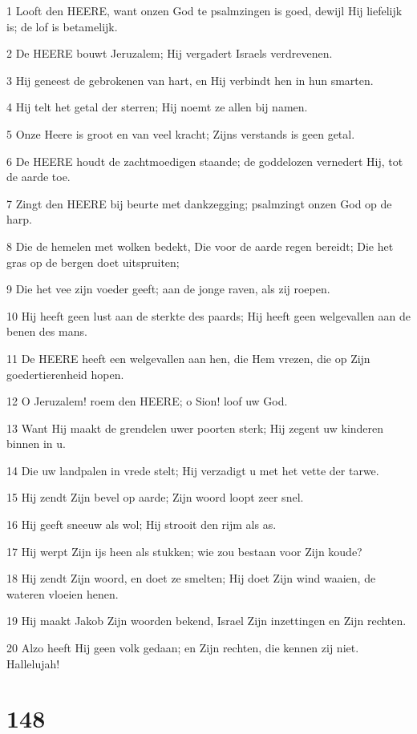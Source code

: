 \par 1 Looft den HEERE, want onzen God te psalmzingen is goed, dewijl Hij liefelijk is; de lof is betamelijk.
\par 2 De HEERE bouwt Jeruzalem; Hij vergadert Israels verdrevenen.
\par 3 Hij geneest de gebrokenen van hart, en Hij verbindt hen in hun smarten.
\par 4 Hij telt het getal der sterren; Hij noemt ze allen bij namen.
\par 5 Onze Heere is groot en van veel kracht; Zijns verstands is geen getal.
\par 6 De HEERE houdt de zachtmoedigen staande; de goddelozen vernedert Hij, tot de aarde toe.
\par 7 Zingt den HEERE bij beurte met dankzegging; psalmzingt onzen God op de harp.
\par 8 Die de hemelen met wolken bedekt, Die voor de aarde regen bereidt; Die het gras op de bergen doet uitspruiten;
\par 9 Die het vee zijn voeder geeft; aan de jonge raven, als zij roepen.
\par 10 Hij heeft geen lust aan de sterkte des paards; Hij heeft geen welgevallen aan de benen des mans.
\par 11 De HEERE heeft een welgevallen aan hen, die Hem vrezen, die op Zijn goedertierenheid hopen.
\par 12 O Jeruzalem! roem den HEERE; o Sion! loof uw God.
\par 13 Want Hij maakt de grendelen uwer poorten sterk; Hij zegent uw kinderen binnen in u.
\par 14 Die uw landpalen in vrede stelt; Hij verzadigt u met het vette der tarwe.
\par 15 Hij zendt Zijn bevel op aarde; Zijn woord loopt zeer snel.
\par 16 Hij geeft sneeuw als wol; Hij strooit den rijm als as.
\par 17 Hij werpt Zijn ijs heen als stukken; wie zou bestaan voor Zijn koude?
\par 18 Hij zendt Zijn woord, en doet ze smelten; Hij doet Zijn wind waaien, de wateren vloeien henen.
\par 19 Hij maakt Jakob Zijn woorden bekend, Israel Zijn inzettingen en Zijn rechten.
\par 20 Alzo heeft Hij geen volk gedaan; en Zijn rechten, die kennen zij niet. Hallelujah!

\chapter{148}

